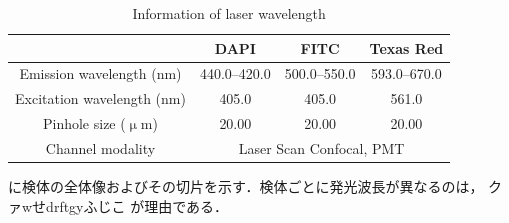 \begin{table}[H]
	\centering
	\caption{Information of laser wavelength}
	\label{tab:レーザー波長}
	\begin{tabular}{cccc}\toprule
		& DAPI & FITC & Texas Red \\ \midrule
		Emission wavelength (nm) & 440.0--420.0 & 500.0--550.0 & 593.0--670.0 \\ 
		Excitation wavelength (nm) & 405.0 & 405.0 & 561.0 \\ 
		Pinhole size ($\upmu$m) & 20.00 & 20.00 & 20.00 \\ 
		Channel modality & \multicolumn{3}{c}{Laser Scan Confocal, PMT } \\ \bottomrule
	\end{tabular}
\end{table}

に検体の全体像およびその切片を示す．検体ごとに発光波長が異なるのは，
クァwせdrftgyふじこ
が理由である．

